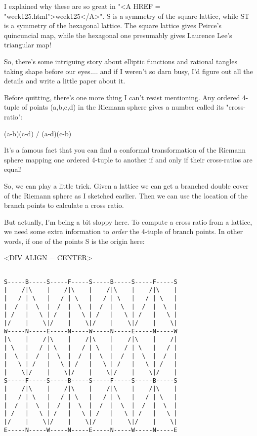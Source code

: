 I explained why these are so great in "<A HREF = "week125.html">week125</A>".  S is a symmetry of
the square lattice, while ST is a symmetry of the hexagonal lattice.
The square lattice gives Peirce's quincuncial map, while the hexagonal
one presumably gives Laurence Lee's triangular map!

So, there's some intriguing story about elliptic functions and rational
tangles taking shape before our eyes.... and if I weren't so darn busy,
I'd figure out all the details and write a little paper about it. 

Before quitting, there's one more thing I can't resist mentioning.
Any ordered 4-tuple of points (a,b,c,d) in the Riemann sphere gives 
a number called its "cross-ratio":

(a-b)(c-d) / (a-d)(c-b)

It's a famous fact that you can find a conformal transformation of
the Riemann sphere mapping one ordered 4-tuple to another if and 
only if their cross-ratios are equal!  

So, we can play a little trick.   Given a lattice we can get a 
branched double cover of the Riemann sphere as I sketched earlier.
Then we can use the location of the branch points to calculate a cross 
ratio.  

But actually, I'm being a bit sloppy here.  To compute a cross ratio 
from a lattice, we need some extra information to \emph{order} the 4-tuple 
of branch points.  In other words, if one of the points S is the origin
here:

<DIV ALIGN = CENTER>

\begin{verbatim}

S-----B-----S-----F-----S-----B-----S-----F-----S
|    /|\    |    /|\    |    /|\    |    /|\    |
|   / | \   |   / | \   |   / | \   |   / | \   |
|  /  |  \  |  /  |  \  |  /  |  \  |  /  |  \  |
| /   |   \ | /   |   \ | /   |   \ | /   |   \ |
|/    |    \|/    |    \|/    |    \|/    |    \|
W-----N-----E-----N-----W-----N-----E-----N-----W
|\    |    /|\    |    /|\    |    /|\    |    /|
| \   |   / | \   |   / | \   |   / | \   |   / |
|  \  |  /  |  \  |  /  |  \  |  /  |  \  |  /  |
|   \ | /   |   \ | /   |   \ | /   |   \ | /   |
|    \|/    |    \|/    |    \|/    |    \|/    |
S-----F-----S-----B-----S-----F-----S-----B-----S
|    /|\    |    /|\    |    /|\    |    /|\    |
|   / | \   |   / | \   |   / | \   |   / | \   |
|  /  |  \  |  /  |  \  |  /  |  \  |  /  |  \  |
| /   |   \ | /   |   \ | /   |   \ | /   |   \ |
|/    |    \|/    |    \|/    |    \|/    |    \|
E-----N-----W-----N-----E-----N-----W-----N-----E
\end{verbatim}
    
